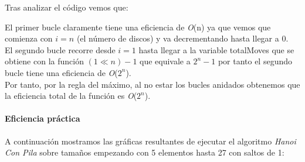 \documentclass[a4paper,12pt]{article} %
\begin{document}
Tras analizar el código vemos que:

El primer bucle claramente tiene una eficiencia de \textit{O}(n) ya que vemos que comienza con $i=n$ (el número de discos)
y va decrementando hasta llegar a 0.\\

El segundo bucle recorre desde $i=1$ hasta llegar a la variable totalMoves que se obtiene con la función
$(1 \ll n) - 1$ que equivale a $2^n - 1$ por tanto el segundo bucle tiene una eficiencia de \textit{O}($2^n$).\\

Por tanto, por la regla del máximo, al no estar los bucles anidados obtenemos que la eficiencia total de la función es \textit{O}($2^n$).\\

\paragraph{Eficiencia práctica}

A continuación mostramos las gráficas resultantes de ejecutar el algoritmo \textit{Hanoi Con Pila}
sobre tamaños empezando con 5 elementos hasta 27 con saltos de 1:
\end{document}
